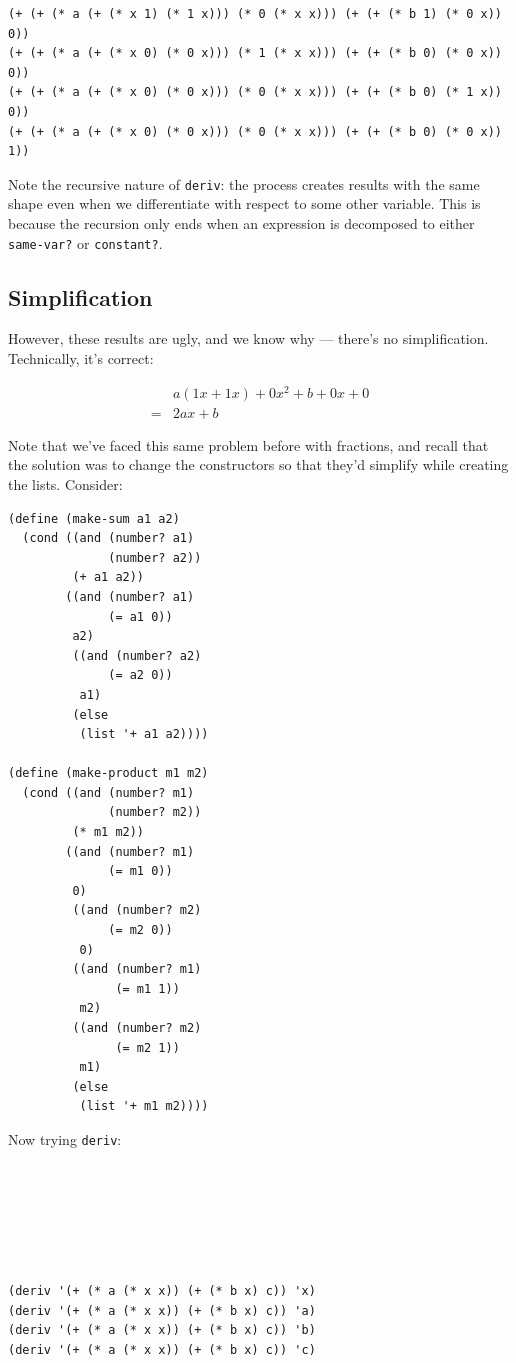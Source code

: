 \documentclass[9pt]{report}
\begin{document}
\begin{verbatim}
(+ (+ (* a (+ (* x 1) (* 1 x))) (* 0 (* x x))) (+ (+ (* b 1) (* 0 x)) 0))
(+ (+ (* a (+ (* x 0) (* 0 x))) (* 1 (* x x))) (+ (+ (* b 0) (* 0 x)) 0))
(+ (+ (* a (+ (* x 0) (* 0 x))) (* 0 (* x x))) (+ (+ (* b 0) (* 1 x)) 0))
(+ (+ (* a (+ (* x 0) (* 0 x))) (* 0 (* x x))) (+ (+ (* b 0) (* 0 x)) 1))
\end{verbatim}


Note the recursive nature of \texttt{deriv}: the process creates results
with the same shape even when we differentiate with respect to
some other variable. This is because the recursion only ends when
an expression is decomposed to either \texttt{same-var?} or \texttt{constant?}.

\subsection{Simplification}
\label{sec:org5396023}

However, these results are ugly, and we know why --- there's no
simplification. Technically, it's correct:

\begin{align*}
&a(1x+1x) + 0x^{2} + b + 0x + 0\\
=& 2ax + b
\end{align*}

Note that we've faced this same problem before with fractions, and
recall that the solution was to change the constructors so that
they'd simplify while creating the lists. Consider:

\begin{verbatim}
(define (make-sum a1 a2)
  (cond ((and (number? a1)
              (number? a2))
         (+ a1 a2))
        ((and (number? a1)
              (= a1 0))
         a2)
         ((and (number? a2)
              (= a2 0))
          a1)
         (else
          (list '+ a1 a2))))

(define (make-product m1 m2)
  (cond ((and (number? m1)
              (number? m2))
         (* m1 m2))
        ((and (number? m1)
              (= m1 0))
         0)
         ((and (number? m2)
              (= m2 0))
          0)
         ((and (number? m1)
               (= m1 1))
          m2)
         ((and (number? m2)
               (= m2 1))
          m1)
         (else
          (list '+ m1 m2))))
\end{verbatim}

Now trying \texttt{deriv}:


\begin{verbatim}






(deriv '(+ (* a (* x x)) (+ (* b x) c)) 'x)
(deriv '(+ (* a (* x x)) (+ (* b x) c)) 'a)
(deriv '(+ (* a (* x x)) (+ (* b x) c)) 'b)
(deriv '(+ (* a (* x x)) (+ (* b x) c)) 'c)
\end{verbatim}
\end{document}
